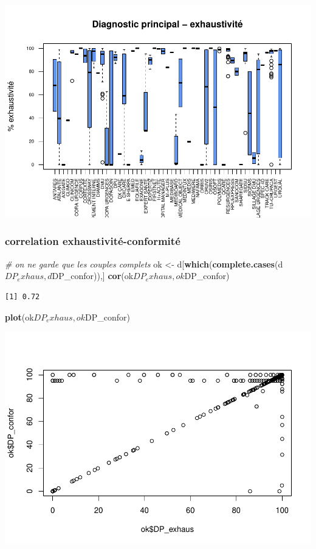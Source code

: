 \documentclass[]{article}
\newenvironment{Shaded}{\begin{snugshade}}{\end{snugshade}}
\newcommand{\KeywordTok}[1]{\textcolor[rgb]{0.13,0.29,0.53}{\textbf{{#1}}}}
\newcommand{\StringTok}[1]{\textcolor[rgb]{0.31,0.60,0.02}{{#1}}}
\newcommand{\CommentTok}[1]{\textcolor[rgb]{0.56,0.35,0.01}{\textit{{#1}}}}
\newcommand{\NormalTok}[1]{{#1}}
\begin{document}
\includegraphics{septembre2015_files/figure-latex/unnamed-chunk-26-1.pdf}

\subsubsection{correlation
exhaustivité-conformité}\label{correlation-exhaustivite-conformite}

\begin{Shaded}
\begin{Highlighting}[]
\CommentTok{# on ne garde que les couples complets}
\NormalTok{ok <-}\StringTok{ }\NormalTok{d[}\KeywordTok{which}\NormalTok{(}\KeywordTok{complete.cases}\NormalTok{(d$DP_exhaus, d$DP_confor)),]}
\KeywordTok{cor}\NormalTok{(ok$DP_exhaus, ok$DP_confor)}
\end{Highlighting}
\end{Shaded}

\begin{verbatim}
[1] 0.72
\end{verbatim}

\begin{Shaded}
\begin{Highlighting}[]
\KeywordTok{plot}\NormalTok{(ok$DP_exhaus, ok$DP_confor)}
\end{Highlighting}
\end{Shaded}

\includegraphics{septembre2015_files/figure-latex/unnamed-chunk-27-1.pdf}
\end{document}
